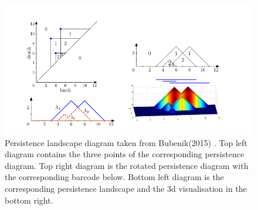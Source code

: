 \documentclass{article}
\begin{document}
\begin{figure}[h!]
    \centering
    \includegraphics{persistence landscape.png}
    \caption{Persistence landscape diagram taken from Bubenik(2015) \cite{bubenik2015statistical}. Top left diagram contains the three points of the corresponding persistence diagram. Top right diagram is the rotated persistence diagram with the corresponding barcode below. Bottom left diagram is the corresponding persistence landscape and the 3d visualisation in the bottom right.}
    \label{fig:landscape}
\end{figure}



\clearpage
\end{document}
